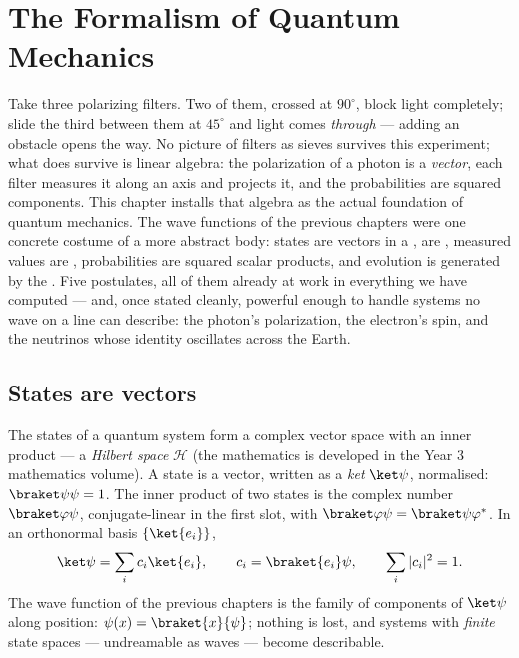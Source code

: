 \chapter{The Formalism of Quantum Mechanics}\label{ch:b3:quantum-formalism}

Take three polarizing filters. Two of them, crossed at $90^\circ$,
block light completely; slide the third between them at $45^\circ$
and light comes \emph{through} --- adding an obstacle opens the way.
No picture of filters as sieves survives this experiment; what does
survive is linear algebra: the polarization of a photon is a
\emph{vector}, each filter measures it along an axis and projects it,
and the probabilities are squared components. This chapter installs
that algebra as the actual foundation of quantum mechanics. The wave
functions of the previous chapters were one concrete costume of a
more abstract body: states are vectors in a ,
 are , measured values are ,
probabilities are squared scalar products, and evolution is generated
by the . Five postulates, all of them already at work in
everything we have computed --- and, once stated cleanly, powerful
enough to handle systems no wave on a line can describe: the photon's
polarization, the electron's spin, and the neutrinos whose identity
oscillates across the Earth.

\section{States are vectors}

\begin{definition}\label{def:b3:quantum-formalism:state}
The states of a quantum system form a complex vector space with an
inner product --- a \emph{Hilbert space} $\mathcal H$ (the
mathematics is developed in the Year 3 mathematics volume). A state
is a vector, written as a \emph{ket} $\ket\psi$, normalised:
$\braket\psi\psi = 1$. The inner product of two states is the complex
number $\braket\varphi\psi$, conjugate-linear in the first slot,
with $\braket\varphi\psi = \braket\psi\varphi^*$. In an orthonormal
basis $\{\ket{e_i}\}$,
\[
\ket\psi = \sum_i c_i\ket{e_i} , \qquad
c_i = \braket{e_i}\psi , \qquad
\sum_i|c_i|^2 = 1 .
\]
The wave function of the previous chapters is the family of
components of $\ket\psi$ along position: $\psi(x) =
\braket{x}{\psi}$; nothing is lost, and systems with \emph{finite}
state spaces --- undreamable as waves --- become describable.
\end{definition}

